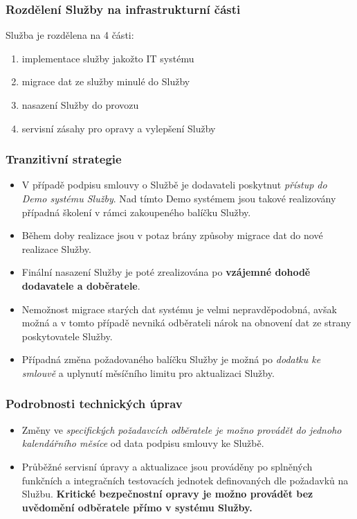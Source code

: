 \documentclass[11pt, a4paper, titlepage]{article}
\begin{document}
	\subsubsection*{Rozdělení Služby na infrastrukturní části}

	Služba je rozdělena na 4 části:
	\begin{enumerate}
		\item implementace služby jakožto IT systému
		\item migrace dat ze služby minulé do Služby
		\item nasazení Služby do provozu
		\item servisní zásahy pro opravy a vylepšení Služby
	\end{enumerate}

	\subsubsection*{Tranzitivní strategie}

	\begin{itemize}
		\item V případě podpisu smlouvy o Službě je dodavateli poskytnut \emph{přístup do Demo systému Služby}. Nad tímto Demo systémem jsou takové realizovány případná školení v rámci zakoupeného balíčku Služby.
		\item Během doby realizace jsou v potaz brány způsoby migrace dat do nové realizace Služby.
		\item Finální nasazení Služby je poté zrealizována po \textbf{vzájemné dohodě dodavatele a doběratele}.
		\item Nemožnost migrace starých dat systému je velmi nepravděpodobná, avšak možná a v tomto případě nevniká odběrateli nárok na obnovení dat ze strany poskytovatele Služby.
		\item Případná změna požadovaného balíčku Služby je možná po \emph{dodatku ke smlouvě} a uplynutí měsíčního limitu pro aktualizaci Služby.
	\end{itemize}

	\subsubsection*{Podrobnosti technických úprav}

	\begin{itemize}
		\item Změny ve \emph{specifických požadavcích odběratele je možno provádět do jednoho kalendářního měsíce} od data podpisu smlouvy ke Službě.
		\item Průběžné servisní úpravy a aktualizace jsou prováděny po splněných funkčních a integračních testovacích jednotek definovaných dle požadavků na Službu. \textbf{Kritické bezpečnostní opravy je možno provádět bez uvědomění odběratele přímo v systému Služby.} 
	\end{itemize}
\end{document}
